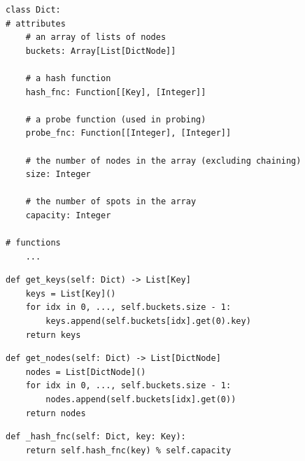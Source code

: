 \documentclass[mathserif, handout]{beamer}
\begin{document}
\begin{frame}[fragile]
	\begin{thmboxbot}
		\begin{lstlisting}[style=mypython]
class Dict:
# attributes
    # an array of lists of nodes
    buckets: Array[List[DictNode]]

    # a hash function
    hash_fnc: Function[[Key], [Integer]]

    # a probe function (used in probing)
    probe_fnc: Function[[Integer], [Integer]]
    
    # the number of nodes in the array (excluding chaining)
    size: Integer

    # the number of spots in the array
    capacity: Integer

# functions
    ...
\end{lstlisting}
	\end{thmboxbot}
\end{frame}

\begin{frame}[fragile]
	\begin{proofbox}
		\begin{lstlisting}[style=mypython]
def get_keys(self: Dict) -> List[Key]
    keys = List[Key]()
    for idx in 0, ..., self.buckets.size - 1:
        keys.append(self.buckets[idx].get(0).key)
    return keys
\end{lstlisting}
	\end{proofbox}
\end{frame}

\begin{frame}[fragile]
	\begin{proofbox}
		\begin{lstlisting}[style=mypython]
def get_nodes(self: Dict) -> List[DictNode]
    nodes = List[DictNode]()
    for idx in 0, ..., self.buckets.size - 1:
        nodes.append(self.buckets[idx].get(0))
    return nodes
\end{lstlisting}
	\end{proofbox}
\end{frame}

\begin{frame}[fragile]
	\begin{proofbox}
		\begin{lstlisting}[style=mypython]
def _hash_fnc(self: Dict, key: Key):
    return self.hash_fnc(key) % self.capacity
\end{lstlisting}
	\end{proofbox}
\end{frame}
\end{document}
